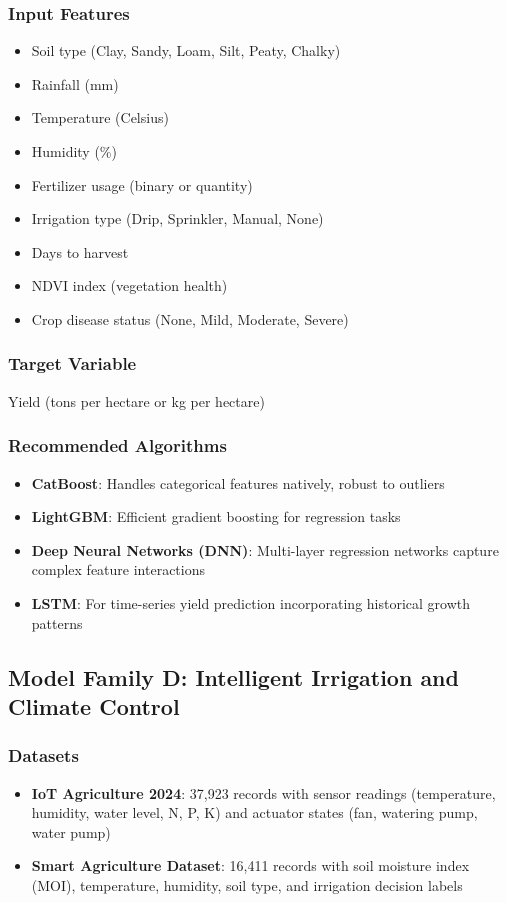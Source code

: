 \documentclass[conference]{IEEEtran}
\begin{document}
\subsubsection{Input Features}
\begin{itemize}
\item Soil type (Clay, Sandy, Loam, Silt, Peaty, Chalky)
\item Rainfall (mm)
\item Temperature (Celsius)
\item Humidity (\%)
\item Fertilizer usage (binary or quantity)
\item Irrigation type (Drip, Sprinkler, Manual, None)
\item Days to harvest
\item NDVI index (vegetation health)
\item Crop disease status (None, Mild, Moderate, Severe)
\end{itemize}

\subsubsection{Target Variable}
Yield (tons per hectare or kg per hectare)

\subsubsection{Recommended Algorithms}
\begin{itemize}
\item \textbf{CatBoost}: Handles categorical features natively, robust to outliers
\item \textbf{LightGBM}: Efficient gradient boosting for regression tasks
\item \textbf{Deep Neural Networks (DNN)}: Multi-layer regression networks capture complex feature interactions
\item \textbf{LSTM}: For time-series yield prediction incorporating historical growth patterns
\end{itemize}

\subsection{Model Family D: Intelligent Irrigation and Climate Control}

\subsubsection{Datasets}
\begin{itemize}
\item \textbf{IoT Agriculture 2024}: 37,923 records with sensor readings (temperature, humidity, water level, N, P, K) and actuator states (fan, watering pump, water pump)
\item \textbf{Smart Agriculture Dataset}: 16,411 records with soil moisture index (MOI), temperature, humidity, soil type, and irrigation decision labels
\end{itemize}
\end{document}
